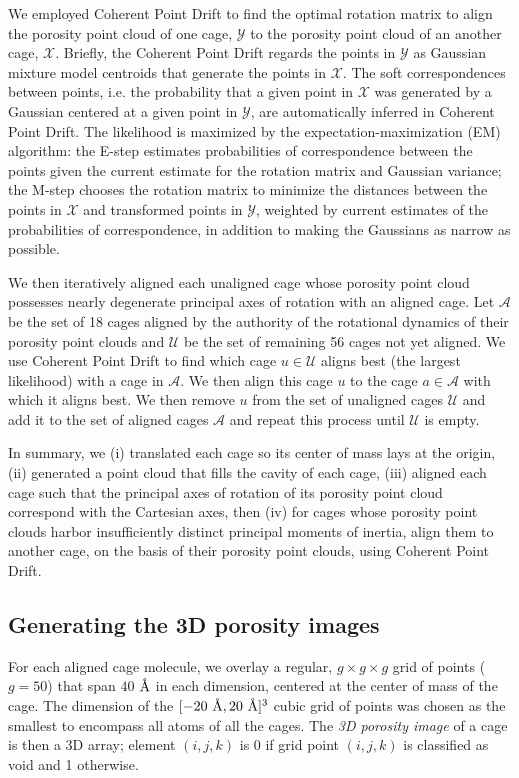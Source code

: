 \documentclass[journal=jacsat,manuscript=article,layout=traditional]{achemso}
\newcommand{\angstrom}{\mbox{\normalfont\AA}}
\begin{document}
{We employed Coherent Point Drift\cite{myronenko2010point} to find the optimal rotation matrix to align the porosity point cloud of one cage, $\mathcal{Y}$ to the porosity point cloud of an another cage, $\mathcal{X}$. Briefly, the Coherent Point Drift regards the points in $\mathcal{Y}$ as Gaussian mixture model centroids that generate the points in $\mathcal{X}$. The soft correspondences between points, i.e. the probability that a given point in $\mathcal{X}$ was generated by a Gaussian centered at a given point in $\mathcal{Y}$, are automatically inferred in Coherent Point Drift. The likelihood is maximized by the expectation-maximization (EM) algorithm: the E-step estimates probabilities of correspondence between the points given the current estimate for the rotation matrix and Gaussian variance; the M-step chooses the rotation matrix to minimize the distances between the points in $\mathcal{X}$ and transformed points in $\mathcal{Y}$, weighted by current estimates of the probabilities of correspondence, in addition to making the Gaussians as narrow as possible.

We then iteratively aligned each unaligned cage whose porosity point cloud possesses nearly degenerate principal axes of rotation with an aligned cage. Let $\mathcal{A}$ be the set of 18 cages aligned by the authority of the rotational dynamics of their porosity point clouds and $\mathcal{U}$ be the set of remaining 56 cages not yet aligned. We use Coherent Point Drift to find which cage $u \in \mathcal{U}$ aligns best (the largest likelihood) with a cage in $\mathcal{A}$. We then align this cage $u$ to the cage $a \in \mathcal{A}$ with which it aligns best. We then remove $u$ from the set of unaligned cages $\mathcal{U}$ and add it to the set of aligned cages $\mathcal{A}$ and repeat this process until $\mathcal{U}$ is empty.

In summary, we (i) translated each cage so its center of mass lays at the origin, (ii) generated a point cloud that fills the cavity of each cage, (iii) aligned each cage such that the principal axes of rotation of its porosity point cloud correspond with the Cartesian axes, then (iv) for cages whose porosity point clouds harbor insufficiently distinct principal moments of inertia, align them to another cage, on the basis of their porosity point clouds, using Coherent Point Drift\cite{myronenko2010point}.
}

\subsection{Generating the 3D porosity images}
For each aligned cage molecule, we overlay a regular, $g\times g\times g$ grid of points ($g=50$) that span $40$ $\angstrom$ in each dimension, centered at the center of mass of the cage. The dimension of the $[-20 \text{ } \angstrom, 20 \text{ } \angstrom]^3$ cubic grid of points was chosen as the smallest to encompass all atoms of all the cages. The \emph{3D porosity image} of a cage is then a 3D array; element $(i, j, k)$ is 0 if grid point $(i, j, k)$ is classified as void and 1 otherwise. 
\end{document}
